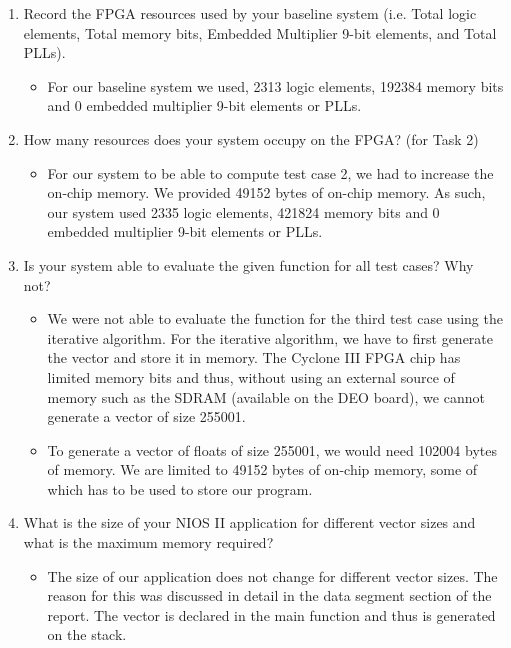 \documentclass{article}
\begin{document}
\begin{enumerate}[align=left]
    \item Record the FPGA resources used by your baseline system (i.e. Total logic elements, Total	memory bits, Embedded Multiplier \num{9}-bit elements, and Total PLLs). 
    \begin{itemize}
        \item For our baseline system we used, \num{2313} logic elements, \num{192384} memory bits and \num{0} embedded multiplier \num{9}-bit elements or PLLs. 
    \end{itemize}
    \item How many resources does your system occupy on the FPGA? (for Task \num{2})
    \begin{itemize}
        \item For our system to be able to compute test case 2, we had to increase the on-chip memory. We provided \num{49152} bytes of on-chip memory. As such, our system used \num{2335} logic elements, \num{421824} memory bits and \num{0} embedded multiplier \num{9}-bit elements or PLLs.
    \end{itemize}
    \item Is your system able to evaluate the given function for all test cases? Why not?
    \begin{itemize}
        \item We were not able to evaluate the function for the third test case using the iterative algorithm. For the iterative algorithm, we have to first generate the vector and store it in memory. The Cyclone III FPGA chip has limited memory bits and thus, without using an external source of memory such as the SDRAM (available on the DEO board), we cannot generate a vector of size 255001.
        \item To generate a vector of floats of size 255001, we would need \num{102004} bytes of memory. We are limited to \num{49152} bytes of on-chip memory, some of which has to be used to store our program.
    \end{itemize}
    \item What is the size of your NIOS II application for different vector sizes and what is the maximum memory required?
    \begin{itemize}
        \item The size of our application does not change for different vector sizes. The reason for this was discussed in detail in the data segment section of the report. The vector is declared in the main function and thus is generated on the stack.

\end{itemize}
\end{enumerate}
\end{document}
